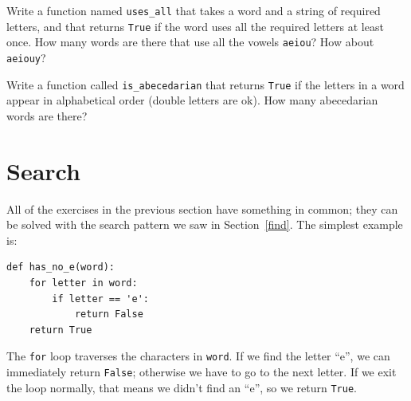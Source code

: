 \documentclass[10pt]{book}
\begin{document}
\begin{CJK}{UTF8}{gbsn}
\begin{exercise}
\end{exercise}


\begin{exercise} 

Write a function named \verb"uses_all" that takes a word and a
string of required letters, and that returns {\tt True} if the word
uses all the required letters at least once.  How many words are there
that use all the vowels {\tt aeiou}?  How about {\tt aeiouy}?

\end{exercise}


\begin{exercise}

Write a function called \verb"is_abecedarian" that returns
{\tt True} if the letters in a word appear in alphabetical order
(double letters are ok).  
How many abecedarian words are there?


\end{exercise}






\section{Search}

All of the exercises in the previous section have something
in common; they can be solved with the search pattern we saw
in Section~\ref{find}.  The simplest example is:

\begin{verbatim}
def has_no_e(word):
    for letter in word:
        if letter == 'e':
            return False
    return True
\end{verbatim}
%
The {\tt for} loop traverses the characters in {\tt word}.  If we find
the letter ``e'', we can immediately return {\tt False}; otherwise we
have to go to the next letter.  If we exit the loop normally, that
means we didn't find an ``e'', so we return {\tt True}.


\end{CJK}
\end{document}
